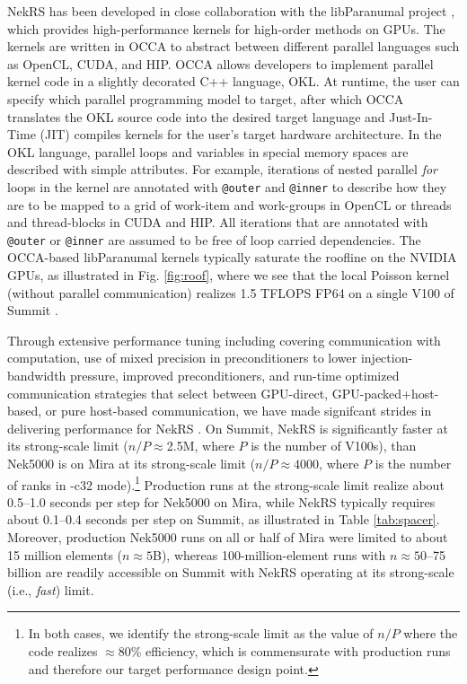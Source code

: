 NekRS has been developed in close collaboration with the libParanumal project
\cite{warburton2019,ChalmersKarakusAustinSwirydowiczWarburton2020,streamParanumal2020},
which provides high-performance kernels for high-order methods on GPUs.  The
kernels are written in OCCA to abstract between different parallel languages
such as OpenCL, CUDA, and HIP. OCCA allows developers to implement parallel
kernel code in a slightly decorated C++ language, OKL.  At runtime, the user
can specify which parallel programming model to target, after which OCCA
translates the OKL source code into the desired target language and
Just-In-Time (JIT) compiles kernels for the user's target hardware
architecture.  In the OKL language, parallel loops and variables in special
memory spaces are described with simple attributes. For example, iterations of
nested parallel {\em for} loops in the kernel are annotated with
\texttt{@outer} and \texttt{@inner} to describe how they are to be mapped to a
grid of work-item and work-groups in OpenCL or threads and thread-blocks in
CUDA and HIP. All iterations that are annotated with \texttt{@outer} or
\texttt{@inner} are assumed to be free of loop carried dependencies. 
The OCCA-based libParanumal kernels
typically saturate the roofline on the NVIDIA GPUs, as illustrated
in Fig. \ref{fig:roof}, where we see that the local Poisson kernel
(without parallel communication) realizes 1.5 TFLOPS FP64 on a single V100
of Summit \cite{ceed_bp_paper_2020}.

Through extensive performance tuning including covering communication with
computation, use of mixed precision in preconditioners to lower
injection-bandwidth pressure, improved preconditioners, and run-time optimized
communication strategies that select between GPU-direct, GPU-packed+host-based,
or pure host-based communication, we have made signifcant strides in delivering
performance for NekRS \cite{nekrs}.  On Summit, NekRS is significantly faster at
its strong-scale limit ($n/P \approx $2.5M, where $P$ is the number of V100s),
than Nek5000 is on Mira at its strong-scale limit ($n/P \approx 4000$, where $P$
is the number of ranks in -c32 mode).\footnote{In both cases, we identify the
strong-scale limit as the value of $n/P$ where the code realizes $\approx$80\%
efficiency, which is commensurate with production runs and therefore our
target performance design point.}  Production runs at the strong-scale
limit realize about 0.5--1.0 seconds per step for Nek5000 on Mira, while NekRS
typically requires about 0.1--0.4 seconds per step on Summit,  as illustrated
in Table \ref{tab:spacer}.  Moreover, production Nek5000 runs on all or half of
Mira were limited to about 15 million elements ($n \approx 5$B), whereas 100-million-element
runs with $n \approx 50$--75 billion are readily accessible on Summit with NekRS
operating at its strong-scale (i.e., {\em fast}) limit.



